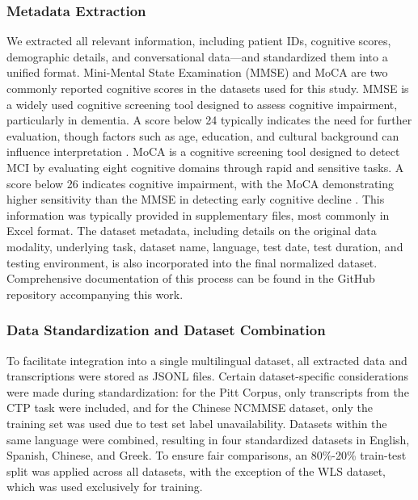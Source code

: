 \subsubsection{Metadata Extraction}
We extracted all relevant information, including patient IDs, cognitive scores, demographic details, and conversational data—and standardized them into a unified format. Mini-Mental State Examination (MMSE) \cite{woodward2005mini} and MoCA \cite{nasreddine2005montreal} are two commonly reported cognitive scores in the datasets used for this study. MMSE is a widely used cognitive screening tool designed to assess cognitive impairment, particularly in dementia. A score below 24 typically indicates the need for further evaluation, though factors such as age, education, and cultural background can influence interpretation \cite{woodward2005mini}. MoCA is a cognitive screening tool designed to detect MCI by evaluating eight cognitive domains through rapid and sensitive tasks. A score below 26 indicates cognitive impairment, with the MoCA demonstrating higher sensitivity than the MMSE in detecting early cognitive decline \cite{nasreddine2005montreal}.
This information was typically provided in supplementary files, most commonly in Excel format. The dataset metadata, including details on the original data modality, underlying task, dataset name, language, test date, test duration, and testing environment, is also incorporated into the final normalized dataset. Comprehensive documentation of this process can be found in the GitHub repository accompanying this work.


\subsubsection{Data Standardization and Dataset Combination}

To facilitate integration into a single multilingual dataset, all extracted data and transcriptions were stored as JSONL files. Certain dataset-specific considerations were made during standardization: for the Pitt Corpus, only transcripts from the CTP task were included, and for the Chinese NCMMSE dataset, only the training set was used due to test set label unavailability. Datasets within the same language were combined, resulting in four standardized datasets in English, Spanish, Chinese, and Greek. To ensure fair comparisons, an 80\%-20\% train-test split was applied across all datasets, with the exception of the WLS dataset, which was used exclusively for training.


